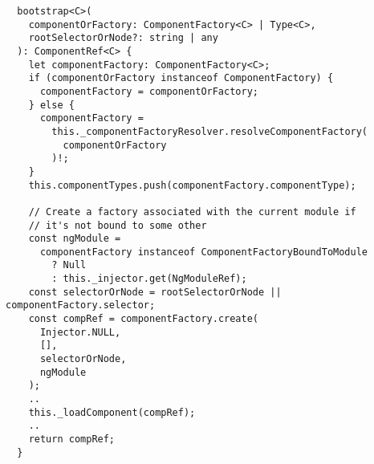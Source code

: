 \begin{verbatim}
  bootstrap<C>(
    componentOrFactory: ComponentFactory<C> | Type<C>,
    rootSelectorOrNode?: string | any
  ): ComponentRef<C> {
    let componentFactory: ComponentFactory<C>;
    if (componentOrFactory instanceof ComponentFactory) {
      componentFactory = componentOrFactory;
    } else {
      componentFactory =
        this._componentFactoryResolver.resolveComponentFactory(
          componentOrFactory
        )!;
    }
    this.componentTypes.push(componentFactory.componentType);

    // Create a factory associated with the current module if
    // it's not bound to some other
    const ngModule =
      componentFactory instanceof ComponentFactoryBoundToModule
        ? Null
        : this._injector.get(NgModuleRef);
    const selectorOrNode = rootSelectorOrNode || componentFactory.selector;
    const compRef = componentFactory.create(
      Injector.NULL,
      [],
      selectorOrNode,
      ngModule
    );
    ..
    this._loadComponent(compRef);
    ..
    return compRef;
  }
\end{verbatim}
